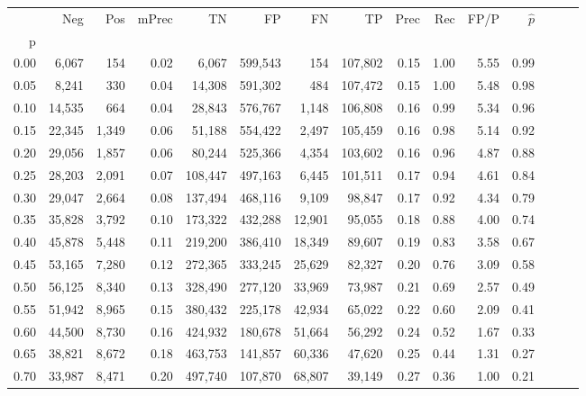 \begin{tabular}{rrrrrrrrrrrrrrr}
\toprule
{} &     Neg &    Pos & mPrec &       TN &       FP &       FN &       TP &  Prec &   Rec &  FP/P & $\hat{p}$ \\
p    &         &        &       &          &          &          &          &       &       &       &           \\
\midrule
0.00 &   6,067 &    154 &  0.02 &    6,067 &  599,543 &      154 &  107,802 &  0.15 &  1.00 &  5.55 &      0.99 \\
0.05 &   8,241 &    330 &  0.04 &   14,308 &  591,302 &      484 &  107,472 &  0.15 &  1.00 &  5.48 &      0.98 \\
0.10 &  14,535 &    664 &  0.04 &   28,843 &  576,767 &    1,148 &  106,808 &  0.16 &  0.99 &  5.34 &      0.96 \\
0.15 &  22,345 &  1,349 &  0.06 &   51,188 &  554,422 &    2,497 &  105,459 &  0.16 &  0.98 &  5.14 &      0.92 \\
0.20 &  29,056 &  1,857 &  0.06 &   80,244 &  525,366 &    4,354 &  103,602 &  0.16 &  0.96 &  4.87 &      0.88 \\
0.25 &  28,203 &  2,091 &  0.07 &  108,447 &  497,163 &    6,445 &  101,511 &  0.17 &  0.94 &  4.61 &      0.84 \\
0.30 &  29,047 &  2,664 &  0.08 &  137,494 &  468,116 &    9,109 &   98,847 &  0.17 &  0.92 &  4.34 &      0.79 \\
0.35 &  35,828 &  3,792 &  0.10 &  173,322 &  432,288 &   12,901 &   95,055 &  0.18 &  0.88 &  4.00 &      0.74 \\
0.40 &  45,878 &  5,448 &  0.11 &  219,200 &  386,410 &   18,349 &   89,607 &  0.19 &  0.83 &  3.58 &      0.67 \\
0.45 &  53,165 &  7,280 &  0.12 &  272,365 &  333,245 &   25,629 &   82,327 &  0.20 &  0.76 &  3.09 &      0.58 \\
0.50 &  56,125 &  8,340 &  0.13 &  328,490 &  277,120 &   33,969 &   73,987 &  0.21 &  0.69 &  2.57 &      0.49 \\
0.55 &  51,942 &  8,965 &  0.15 &  380,432 &  225,178 &   42,934 &   65,022 &  0.22 &  0.60 &  2.09 &      0.41 \\
0.60 &  44,500 &  8,730 &  0.16 &  424,932 &  180,678 &   51,664 &   56,292 &  0.24 &  0.52 &  1.67 &      0.33 \\
0.65 &  38,821 &  8,672 &  0.18 &  463,753 &  141,857 &   60,336 &   47,620 &  0.25 &  0.44 &  1.31 &      0.27 \\
0.70 &  33,987 &  8,471 &  0.20 &  497,740 &  107,870 &   68,807 &   39,149 &  0.27 &  0.36 &  1.00 &      0.21 \\

\end{tabular}

